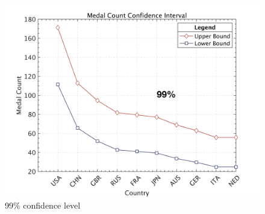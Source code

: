 \documentclass{mcmthesis}  %
\begin{document}
\begin{figure}[H]
\begin{minipage}{0.45\textwidth}
        \includegraphics[width=\linewidth]{5个置信区间/99.png}
        \caption{99\% confidence level}
    \end{minipage}
\end{figure}
\end{document}
